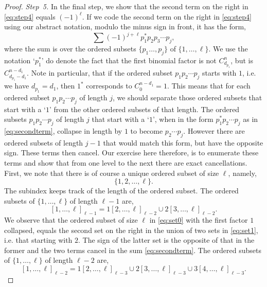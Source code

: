 \documentclass[5p,twocolumn]{elsarticle}
\begin{document}
\begin{proof}
  \emph{Step~5.} In the final step, we show that the second term on the right in \eqref{eq:step4} equals $(-1)^\ell$.
  If we code the second term on the right in \eqref{eq:step4} using our abstract notation, modulo the minus sign in front, it has the form,
  \begin{equation}\label{eq:secondterm}
  \sum (-1)^{j+\ell}p_1^\ast p_2p_3\cdots p_j,
  \end{equation}  
  where the sum is over the ordered subsets  $\{p_1\ldots,p_j\}$ of $\{1,\ldots,\ell\}$.
  We use the notation `$p_1^\ast$' do denote the fact that the first binomial factor is not $C_{d_{p_1}}^{n}$, but is $C_{d_{p_1}-d_1}^{n-d_1}$.
  Note in particular, that if the ordered subset $p_1p_2\cdots p_j$ starts with $1$, i.e.\/ we have $d_{p_1}=d_1$, then $1^\ast$ corresponds to $C_0^{n-d_1}=1$.
  This means that for each ordered subset $p_1p_2\cdots p_j$ of length $j$, we should separate those ordered subsets that start with a `$1$' from the other ordered subsets of that length.
  The ordered subsets $p_1p_2\cdots p_j$ of length $j$ that start with a `$1$', when in the form $p_1^\ast p_2\cdots p_j$ as in \eqref{eq:secondterm}, collapse in length by $1$ to become $p_2\cdots p_j$.
  However there are ordered subsets of length $j-1$ that would match this form, but have the opposite sign. These terms then cancel.
  Our exercise here therefore, is to enumerate these terms and show that from one level to the next there are exact cancellations.
  First, we note that there is of course a unique ordered subset of size $\ell$, namely,
  \begin{equation}\label{eq:set0}
    \{1,2,\ldots,\ell\}.
  \end{equation}
  The subindex keeps track of the length of the ordered subset. The ordered subsets of $\{1,\ldots,\ell\}$ of length $\ell-1$ are,
  \begin{equation}\label{eq:set1}
    [1,\ldots,\ell]_{\ell-1}=1[2,\ldots,\ell]_{\ell-2}\cup 2[3,\ldots,\ell]_{\ell-2}. 
  \end{equation}
  We observe that the ordered subset of size $\ell$ in \eqref{eq:set0} with the first factor $1$ collapsed, equals the second set on the right in the union of two sets in \eqref{eq:set1}, i.e.\/ that starting with $2$.
  The sign of the latter set is the opposite of that in the former and the two terms cancel in the sum \eqref{eq:secondterm}.
  The ordered subsets of $\{1,\ldots,\ell\}$ of length $\ell-2$ are,
  \begin{equation}\label{eq:set2}
    [1,\ldots,\ell]_{\ell-2}=1[2,\ldots,\ell]_{\ell-3}\cup 2[3,\ldots,\ell]_{\ell-3}\cup 3[4,\ldots,\ell]_{\ell-3}.  

\end{equation}
\end{proof}
\end{document}

